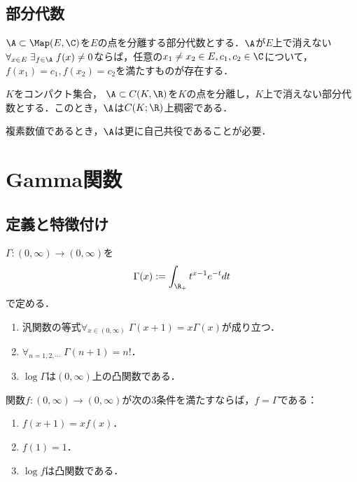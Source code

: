 \documentclass[uplatex, dvipdfmx]{jsreport}
\begin{document}
\subsection{部分代数}

\begin{lemma}[補間多項式の一般化]
    $\A\subset\Map(E,\C)$を$E$の点を分離する部分代数とする．$\A$が$E$上で消えない$\forall_{x\in E}\;\exists_{f\in\A}\;f(x)\ne0$ならば，任意の$x_1\ne x_2\in E,c_1,c_2\in\C$について，$f(x_1)=c_1,f(x_2)=c_2$を満たすものが存在する．
\end{lemma}

\begin{theorem}
    $K$をコンパクト集合，
    $\A\subset C(K,\R)$を$K$の点を分離し，$K$上で消えない部分代数とする．このとき，$\A$は$C(K;\R)$上稠密である．
\end{theorem}
\begin{remarks}
    複素数値であるとき，$\A$は更に自己共役であることが必要．
\end{remarks}

\section{Gamma関数}

\subsection{定義と特徴付け}

\begin{definition}
    $\Gamma:(0,\infty)\to(0,\infty)$を
    \[\Gamma(x):=\int_{\R_+}t^{x-1}e^{-t}dt\]
    で定める．
\end{definition}

\begin{theorem}[Gamma関数の性質]\mbox{}
    \begin{enumerate}
        \item 汎関数の等式$\forall_{x\in(0,\infty)}\;\Gamma(x+1)=x\Gamma(x)$が成り立つ．
        \item $\forall_{n=1,2,\cdots}\;\Gamma(n+1)=n!$．
        \item $\log\Gamma$は$(0,\infty)$上の凸関数である．
    \end{enumerate}
\end{theorem}

\begin{theorem}[Gamma関数の特徴付け]
    関数$f:(0,\infty)\to(0,\infty)$が次の3条件を満たすならば，$f=\Gamma$である：
    \begin{enumerate}
        \item $f(x+1)=xf(x)$．
        \item $f(1)=1$．
        \item $\log f$は凸関数である．
    \end{enumerate}
\end{theorem}
\end{document}
